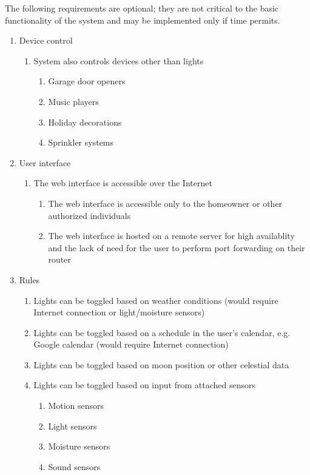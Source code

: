 \documentclass[12pt]{article}
\begin{document}
The following requirements are optional; they are not critical to the basic
functionality of the system and may be implemented only if time permits.

\begin{enumerate}[resume]
    \item Device control
        \begin{enumerate}
            \item System also controls devices other than lights
                \begin{enumerate}
                    \item Garage door openers
                    \item Music players
                    \item Holiday decorations
                    \item Sprinkler systems
                \end{enumerate}
        \end{enumerate}
    \item User interface
        \begin{enumerate}
            \item The web interface is accessible over the Internet
                \begin{enumerate}
                    \item The web interface is accessible only to the homeowner or other authorized individuals
                    \item The web interface is hosted on a remote server for high availablity and the lack of need for the user to perform port forwarding on their router
                \end{enumerate}
        \end{enumerate}
    \item Rules
        \begin{enumerate}
            \item Lights can be toggled based on weather conditions (would require Internet connection or light/moisture sensors)
            \item Lights can be toggled based on a schedule in the user's calendar, e.g. Google calendar (would require Internet connection)
            \item Lights can be toggled based on moon position or other celestial data
            \item Lights can be toggled based on input from attached sensors
                \begin{enumerate}
                    \item Motion sensors
                    \item Light sensors
                    \item Moisture sensors
                    \item Sound sensors
                \end{enumerate}
        \end{enumerate}
\end{enumerate}
\end{document}
